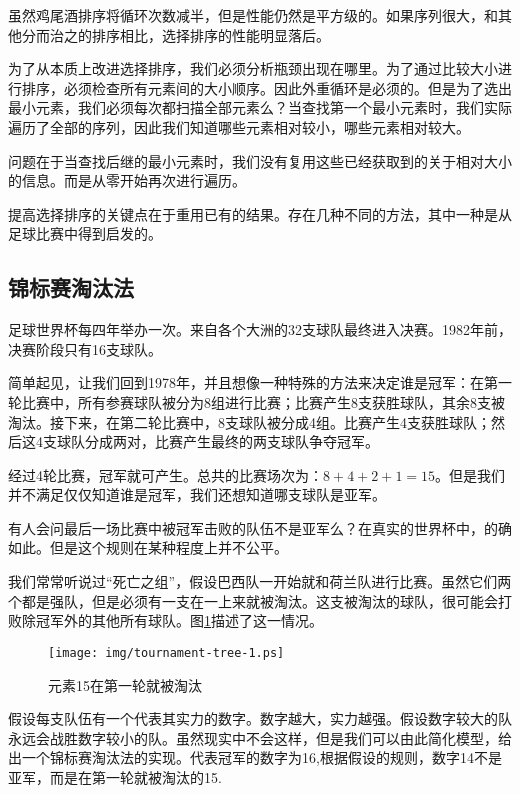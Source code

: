 \documentclass{ctexart}
\begin{document}
虽然鸡尾酒排序将循环次数减半，但是性能仍然是平方级的。如果序列很大，和其他分而治之的排序相比，选择排序的性能明显落后。

为了从本质上改进选择排序，我们必须分析瓶颈出现在哪里。为了通过比较大小进行排序，必须检查所有元素间的大小顺序。因此外重循环是必须的。但是为了选出最小元素，我们必须每次都扫描全部元素么？当查找第一个最小元素时，我们实际遍历了全部的序列，因此我们知道哪些元素相对较小，哪些元素相对较大。

问题在于当查找后继的最小元素时，我们没有复用这些已经获取到的关于相对大小的信息。而是从零开始再次进行遍历。

提高选择排序的关键点在于重用已有的结果。存在几种不同的方法，其中一种是从足球比赛中得到启发的。

\subsection{锦标赛淘汰法}

足球世界杯每四年举办一次。来自各个大洲的32支球队最终进入决赛。1982年前，决赛阶段只有16支球队\cite{wiki-wc}。

简单起见，让我们回到1978年，并且想像一种特殊的方法来决定谁是冠军：在第一轮比赛中，所有参赛球队被分为8组进行比赛；比赛产生8支获胜球队，其余8支被淘汰。接下来，在第二轮比赛中，8支球队被分成4组。比赛产生4支获胜球队；然后这4支球队分成两对，比赛产生最终的两支球队争夺冠军。

经过4轮比赛，冠军就可产生。总共的比赛场次为：$8+4+2+1 = 15$。但是我们并不满足仅仅知道谁是冠军，我们还想知道哪支球队是亚军。

有人会问最后一场比赛中被冠军击败的队伍不是亚军么？在真实的世界杯中，的确如此。但是这个规则在某种程度上并不公平。

我们常常听说过“死亡之组”，假设巴西队一开始就和荷兰队进行比赛。虽然它们两个都是强队，但是必须有一支在一上来就被淘汰。这支被淘汰的球队，很可能会打败除冠军外的其他所有球队。图\ref{fig:tournament-tree-1}描述了这一情况。

\begin{figure}[htbp]
  \centering
  \texttt{[image: img/tournament-tree-1.ps]}
  \caption{元素15在第一轮就被淘汰}
  \label{fig:tournament-tree-1}
\end{figure}

假设每支队伍有一个代表其实力的数字。数字越大，实力越强。假设数字较大的队永远会战胜数字较小的队。虽然现实中不会这样，但是我们可以由此简化模型，给出一个锦标赛淘汰法的实现。代表冠军的数字为16,根据假设的规则，数字14不是亚军，而是在第一轮就被淘汰的15.
\end{document}
